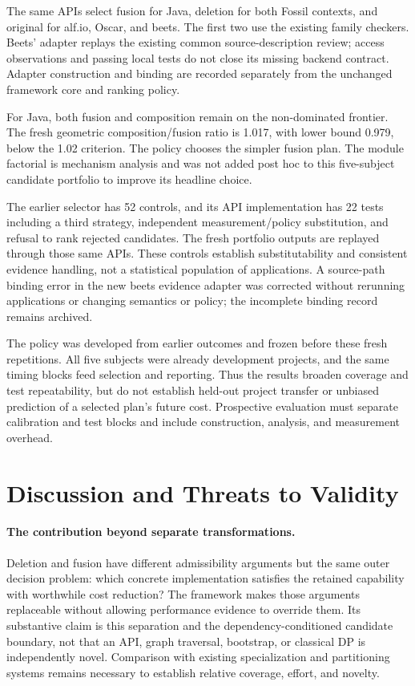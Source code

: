\documentclass[acmsmall,screen,review,anonymous]{acmart}
\begin{document}
The same APIs select fusion for Java, deletion for both Fossil contexts, and
original for alf.io, Oscar, and beets. The first two use the existing family
checkers. Beets' adapter replays the existing common source-description review;
access observations and passing local tests do not close its missing backend
contract. Adapter construction and binding are recorded separately from the
unchanged framework core and ranking policy.

For Java, both fusion and composition remain on the non-dominated frontier.
The fresh geometric composition/fusion ratio is 1.017, with lower bound 0.979,
below the 1.02 criterion. The policy chooses the simpler fusion plan. The
module factorial is mechanism analysis and was not added post hoc to this
five-subject candidate portfolio to improve its headline choice.

The earlier selector has 52 controls, and its API implementation has 22 tests
including a third strategy, independent measurement/policy substitution, and
refusal to rank rejected candidates. The fresh portfolio outputs are replayed
through those same APIs. These controls establish substitutability and
consistent evidence handling, not a statistical population of applications.
A source-path binding error in the new beets evidence adapter was corrected
without rerunning applications or changing semantics or policy; the incomplete
binding record remains archived.

The policy was developed from earlier outcomes and frozen before these fresh
repetitions. All five subjects were already development projects, and the
same timing blocks feed selection and reporting. Thus the results broaden
coverage and test repeatability, but do not establish held-out project transfer
or unbiased prediction of a selected plan's future cost. Prospective evaluation
must separate calibration and test blocks and include construction, analysis,
and measurement overhead.

\section{Discussion and Threats to Validity}
\label{sec:discussion}
\paragraph{The contribution beyond separate transformations.}
Deletion and fusion have different admissibility arguments but the same outer
decision problem: which concrete implementation satisfies the retained capability
with worthwhile cost reduction? The framework makes those arguments replaceable
without allowing performance evidence to override them. Its substantive claim
is this separation and the dependency-conditioned candidate boundary, not that
an API, graph traversal, bootstrap, or classical DP is independently novel.
Comparison with existing specialization and partitioning systems remains
necessary to establish relative coverage, effort, and novelty.
\end{document}
